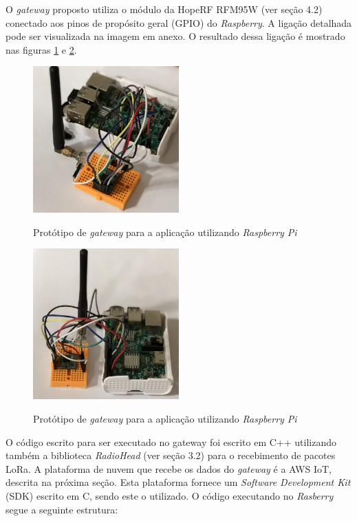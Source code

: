 \documentclass[
    hidelinks,
	12pt,				%
	openany,
	oneside, 
	a4paper,			%
	english,			%
	french,				%
	spanish,			%
	brazil				%
	]{abntex2}
\begin{document}
O \textit{gateway} proposto utiliza o módulo da HopeRF RFM95W (ver seção 4.2) conectado aos pinos de propósito geral (GPIO) do \textit{Raspberry}. A ligação detalhada pode ser visualizada na imagem em anexo. O resultado dessa ligação é mostrado nas figuras \ref{fig:g1} e \ref{fig:g2}.

\begin{figure}[ht]
    \centering  
    \caption{Protótipo de \textit{gateway} para a aplicação utilizando \textit{Raspberry Pi}}
    \includegraphics[width=0.5\textwidth]{g1.png}
    \label{fig:g1}
\end{figure}
\begin{figure}[ht]
    \centering
    \caption{Protótipo de \textit{gateway} para a aplicação utilizando \textit{Raspberry Pi}}
    \includegraphics[width=0.5\textwidth]{g2.png}
    \label{fig:g2}
\end{figure}
O código escrito para ser executado no gateway foi escrito em C++ utilizando também a biblioteca \textit{RadioHead} (ver seção 3.2) para o recebimento de pacotes LoRa. A plataforma de nuvem que recebe os dados do \textit{gateway} é a AWS IoT, descrita na próxima seção. Esta plataforma fornece um \textit{Software Development Kit} (SDK) escrito em C, sendo este o utilizado. O código executando no \textit{Rasberry} segue a seguinte estrutura:
\end{document}
